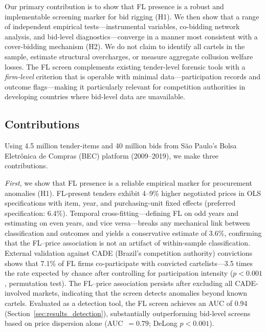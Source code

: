 \noindent Our primary contribution is to show that FL presence is a
robust and implementable screening marker for bid rigging (H1). We then
show that a range of independent empirical tests---instrumental
variables, co-bidding network analysis, and bid-level
diagnostics---converge in a manner most consistent with a cover-bidding
mechanism (H2). We do not claim to identify all cartels in the sample,
estimate structural overcharges, or measure aggregate collusion welfare
losses. The FL screen complements existing tender-level forensic tools
\citep{imhof2019detecting} with a \emph{firm-level} criterion that is
operable with minimal data---participation records and outcome
flags---making it particularly relevant for competition authorities in
developing countries where bid-level data are unavailable.

\subsection{Contributions}

Using 4.5 million tender-items and 40 million bids from S\~ao Paulo's
Bolsa Eletr\^onica de Compras (BEC) platform (2009--2019), we make three
contributions.

\emph{First}, we show that FL presence is a reliable empirical marker %
for procurement anomalies (H1). FL-present tenders exhibit 4--9\%
higher negotiated prices in OLS specifications with item, year, and
purchasing-unit fixed effects (preferred specification: 6.4\%). %
Temporal cross-fitting---defining FL on odd years and estimating on
even years, and vice versa---breaks any mechanical link between
classification and outcomes and yields a conservative estimate of
3.6\%, confirming that the FL--price association is not an artifact
of within-sample classification. External validation against CADE
(Brazil's competition authority) convictions shows that 7.1\% of FL
firms co-participate with convicted cartelists---3.5 times the rate
expected by chance after controlling for participation intensity
($p < 0.001$, permutation test). The FL--price association persists
after excluding all CADE-involved markets, indicating that the screen
detects anomalies beyond known cartels. Evaluated as a detection tool,
the FL screen achieves an AUC of 0.94 (Section~\ref{sec:results_detection}),
substantially outperforming bid-level screens based on price dispersion
alone (AUC~$= 0.79$; DeLong $p < 0.001$). %

